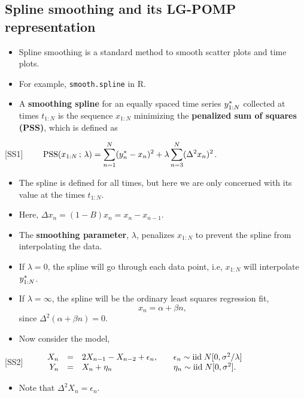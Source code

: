 \documentclass[]{article}
\providecommand{\tightlist}{%
  \setlength{\itemsep}{0pt}\setlength{\parskip}{0pt}}
\begin{document}
\subsection{Spline smoothing and its LG-POMP
representation}\label{spline-smoothing-and-its-lg-pomp-representation}

\begin{itemize}
\item
  Spline smoothing is a standard method to smooth scatter plots and time
  plots.
\item
  For example, \texttt{smooth.spline} in R.
\item
  A \textbf{smoothing spline} for an equally spaced time series
  \(y_{1:N}^*\) collected at times \(t_{1:N}\) is the sequence
  \(x_{1:N}\) minimizing the \textbf{penalized sum of squares (PSS)},
  which is defined as
\end{itemize}

{[}SS1{]}
\(\quad\quad \displaystyle   \mathrm{PSS}(x_{1:N}\, ; \,\lambda)  = \sum_{n=1}^N(y_n^*-x_n)^2 + \lambda\sum_{n=3}^N(\Delta^2 x_n)^2\).

\begin{itemize}
\item
  The spline is defined for all times, but here we are only concerned
  with its value at the times \(t_{1:N}\).
\item
  Here, \(\Delta x_n = (1-B)x_n = x_n - x_{n-1}.\)
\item
  The \textbf{smoothing parameter}, \(\lambda\), penalizes \(x_{1:N}\)
  to prevent the spline from interpolating the data.
\item
  If \(\lambda=0\), the spline will go through each data point, i.e,
  \(x_{1:N}\) will interpolate \(y_{1:N}^*\).
\item
  If \(\lambda=\infty\), the spline will be the ordinary least squares
  regression fit, \[ x_n = \alpha + \beta n,\] since
  \(\Delta^2(\alpha + \beta n) = 0\).
\item
  Now consider the model,
\end{itemize}

{[}SS2{]}
\(\quad\quad \begin{array}{rclcl} X_n &=& 2X_{n-1}-X_{n-2} + \epsilon_n, & & \epsilon_n\sim \mathrm{iid}\; N[0,\sigma^2/\lambda]\\ Y_n &=& X_n + \eta_n & & \eta_n\sim \mathrm{iid}\; N[0,\sigma^2]. \end{array}\)

\begin{itemize}
\tightlist
\item
  Note that \(\Delta^2 X_n = \epsilon_n\).
\end{itemize}
\end{document}
